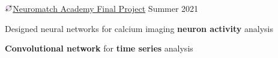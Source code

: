 \begin{cventries}
  \cventry
    {\includegraphics[width=3.5mm]{snippy-nma.png}\href{https://portal.neuromatchacademy.org/certificate/a6398835-adc9-4528-99d6-347675c05ffd}{Neuromatch Academy Final Project}}
    {}
    {}
    {Summer 2021}
    {
      \begin{cvitems}
        \item {Designed neural networks for calcium imaging \textbf{neuron activity} analysis}
        \item {\textbf{Convolutional network} for \textbf{time series} analysis}
      \end{cvitems}
    }

\end{cventries}